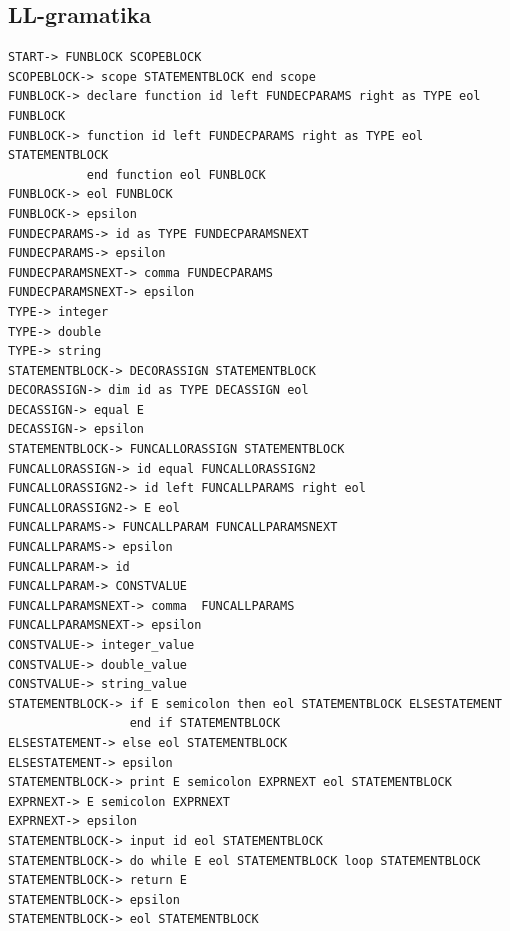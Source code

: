 \documentclass[a4paper, 12pt]{article}
\begin{document}
\subsection{LL-gramatika} \label{subsec:llgram}
\begin{verbatim}
START-> FUNBLOCK SCOPEBLOCK  
SCOPEBLOCK-> scope STATEMENTBLOCK end scope  
FUNBLOCK-> declare function id left FUNDECPARAMS right as TYPE eol FUNBLOCK  
FUNBLOCK-> function id left FUNDECPARAMS right as TYPE eol STATEMENTBLOCK
           end function eol FUNBLOCK  
FUNBLOCK-> eol FUNBLOCK  
FUNBLOCK-> epsilon  
FUNDECPARAMS-> id as TYPE FUNDECPARAMSNEXT  
FUNDECPARAMS-> epsilon
FUNDECPARAMSNEXT-> comma FUNDECPARAMS  
FUNDECPARAMSNEXT-> epsilon   
TYPE-> integer   
TYPE-> double   
TYPE-> string   
STATEMENTBLOCK-> DECORASSIGN STATEMENTBLOCK   
DECORASSIGN-> dim id as TYPE DECASSIGN eol   
DECASSIGN-> equal E   
DECASSIGN-> epsilon   
STATEMENTBLOCK-> FUNCALLORASSIGN STATEMENTBLOCK   
FUNCALLORASSIGN-> id equal FUNCALLORASSIGN2   
FUNCALLORASSIGN2-> id left FUNCALLPARAMS right eol   
FUNCALLORASSIGN2-> E eol   
FUNCALLPARAMS-> FUNCALLPARAM FUNCALLPARAMSNEXT   
FUNCALLPARAMS-> epsilon   
FUNCALLPARAM-> id   
FUNCALLPARAM-> CONSTVALUE   
FUNCALLPARAMSNEXT-> comma  FUNCALLPARAMS   
FUNCALLPARAMSNEXT-> epsilon   
CONSTVALUE-> integer_value   
CONSTVALUE-> double_value 
CONSTVALUE-> string_value   
STATEMENTBLOCK-> if E semicolon then eol STATEMENTBLOCK ELSESTATEMENT 
                 end if STATEMENTBLOCK   
ELSESTATEMENT-> else eol STATEMENTBLOCK   
ELSESTATEMENT-> epsilon  
STATEMENTBLOCK-> print E semicolon EXPRNEXT eol STATEMENTBLOCK   
EXPRNEXT-> E semicolon EXPRNEXT   
EXPRNEXT-> epsilon   
STATEMENTBLOCK-> input id eol STATEMENTBLOCK   
STATEMENTBLOCK-> do while E eol STATEMENTBLOCK loop STATEMENTBLOCK   
STATEMENTBLOCK-> return E   
STATEMENTBLOCK-> epsilon   
STATEMENTBLOCK-> eol STATEMENTBLOCK 
\end{verbatim}
\newpage
\end{document}
